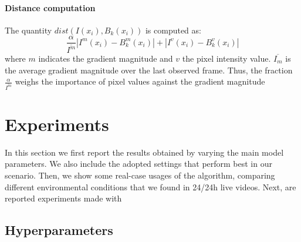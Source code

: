 \paragraph{Distance computation}
The quantity $ dist(I(x_i),B_k(x_i)) $ is computed as:
\begin{equation} \label{eq:dist}
\frac{\alpha}{\overline{I^m}}|I^m(x_i) - B_k^m(x_i)| + |I^v(x_i) - B_k^v(x_i)|
\end{equation}
where $m$ indicates the gradient magnitude and $v$ the pixel intensity value. $\overline{I_m}$ is the average gradient magnitude over the last observed frame. Thus, the fraction $\frac{\alpha}{\overline{I^m}}$ weighs the importance
of pixel values against the gradient magnitude

\section*{Experiments}

In this section we first report the results obtained by varying the main model parameters. We also include the adopted settings that perform best in our scenario. Then, we show some real-case usages of the algorithm, comparing different environmental conditions that we found in 24/24h live videos. Next, are reported experiments made with 

\subsection{Hyperparameters}

